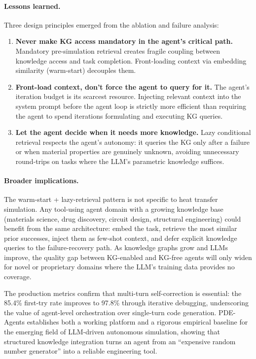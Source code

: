 \documentclass[twocolumn]{article}
\newif\ifrevisionsvisible
\newcommand{\revised}[1]{%
  \ifrevisionsvisible\textcolor{revisionred}{#1}\else#1\fi}
\begin{document}
\paragraph{Lessons learned.}
Three design principles emerged from the ablation and failure analysis:
\begin{enumerate}
  \item \textbf{Never make KG access mandatory in the agent's critical path.}
        Mandatory pre-simulation retrieval creates fragile coupling between
        knowledge access and task completion.  Front-loading context via
        embedding similarity (warm-start) decouples them.
  \item \textbf{Front-load context, don't force the agent to query for it.}
        The agent's iteration budget is its scarcest resource.  Injecting
        relevant context into the system prompt before the agent loop is
        strictly more efficient than requiring the agent to spend iterations
        formulating and executing KG queries.
  \item \textbf{Let the agent decide when it needs more knowledge.}
        Lazy conditional retrieval respects the agent's autonomy: it queries
        the KG only after a failure or when material properties are genuinely
        unknown, avoiding unnecessary round-trips on tasks where the LLM's
        parametric knowledge suffices.
\end{enumerate}

\paragraph{Broader implications.}
The warm-start + lazy-retrieval pattern is not specific to heat transfer
simulation.  Any tool-using agent domain with a growing knowledge base
(materials science, drug discovery, circuit design, structural
engineering) could benefit from the same architecture: embed the task,
retrieve the most similar prior successes, inject them as few-shot
context, and defer explicit knowledge queries to the failure-recovery
path.  As knowledge graphs grow and LLMs improve, the quality gap
between KG-enabled and KG-free agents will only widen for novel or
proprietary domains where the LLM's training data provides no coverage.

The production metrics confirm that multi-turn self-correction is
essential: the \revised{85.4\%} first-try rate improves to 97.8\% through
iterative debugging, underscoring the value of agent-level orchestration
over single-turn code generation.  PDE-Agents establishes both a working
platform and a rigorous empirical baseline for the emerging field of
LLM-driven autonomous simulation, showing that structured knowledge
integration turns an agent from an ``expensive random number
generator'' into a reliable engineering tool.
\end{document}
